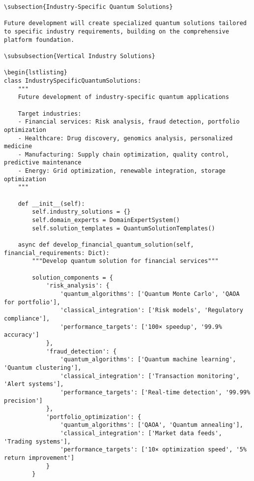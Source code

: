 \documentclass[12pt,a4paper]{report}
\begin{document}
\begin{lstlisting}
\subsection{Industry-Specific Quantum Solutions}

Future development will create specialized quantum solutions tailored to specific industry requirements, building on the comprehensive platform foundation.

\subsubsection{Vertical Industry Solutions}

\begin{lstlisting}
class IndustrySpecificQuantumSolutions:
    """
    Future development of industry-specific quantum applications

    Target industries:
    - Financial services: Risk analysis, fraud detection, portfolio optimization
    - Healthcare: Drug discovery, genomics analysis, personalized medicine
    - Manufacturing: Supply chain optimization, quality control, predictive maintenance
    - Energy: Grid optimization, renewable integration, storage optimization
    """

    def __init__(self):
        self.industry_solutions = {}
        self.domain_experts = DomainExpertSystem()
        self.solution_templates = QuantumSolutionTemplates()

    async def develop_financial_quantum_solution(self, financial_requirements: Dict):
        """Develop quantum solution for financial services"""

        solution_components = {
            'risk_analysis': {
                'quantum_algorithms': ['Quantum Monte Carlo', 'QAOA for portfolio'],
                'classical_integration': ['Risk models', 'Regulatory compliance'],
                'performance_targets': ['100× speedup', '99.9% accuracy']
            },
            'fraud_detection': {
                'quantum_algorithms': ['Quantum machine learning', 'Quantum clustering'],
                'classical_integration': ['Transaction monitoring', 'Alert systems'],
                'performance_targets': ['Real-time detection', '99.99% precision']
            },
            'portfolio_optimization': {
                'quantum_algorithms': ['QAOA', 'Quantum annealing'],
                'classical_integration': ['Market data feeds', 'Trading systems'],
                'performance_targets': ['10× optimization speed', '5% return improvement']
            }
        }


\end{lstlisting}
\end{document}
